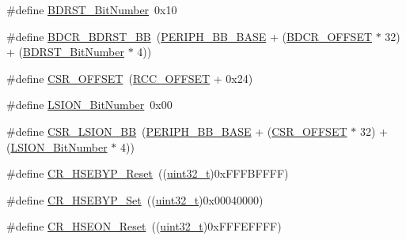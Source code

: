 \begin{DoxyCompactItemize}
\item 
\#define \hyperlink{group___r_c_c___private___defines_gae6718158034388d8fde8caaa28ffe8b9}{B\+D\+R\+S\+T\+\_\+\+Bit\+Number}~0x10
\item 
\#define \hyperlink{group___r_c_c___private___defines_ga892fdf297b85b85cbaf0723649b31818}{B\+D\+C\+R\+\_\+\+B\+D\+R\+S\+T\+\_\+\+BB}~(\hyperlink{openmotestm_2library_2inc_2stm32f10x__map_8h_aed7efc100877000845c236ccdc9e144a}{P\+E\+R\+I\+P\+H\+\_\+\+B\+B\+\_\+\+B\+A\+SE} + (\hyperlink{openmotestm_2library_2src_2stm32f10x__rcc_8c_a5f8a0c3cb5f5c835bf7eef09515138ad}{B\+D\+C\+R\+\_\+\+O\+F\+F\+S\+ET} $\ast$ 32) + (\hyperlink{openmotestm_2library_2src_2stm32f10x__rcc_8c_ae6718158034388d8fde8caaa28ffe8b9}{B\+D\+R\+S\+T\+\_\+\+Bit\+Number} $\ast$ 4))
\item 
\#define \hyperlink{group___r_c_c___private___defines_ga984cbe73312b6d3d355c5053763d499a}{C\+S\+R\+\_\+\+O\+F\+F\+S\+ET}~(\hyperlink{openmotestm_2library_2src_2stm32f10x__rcc_8c_a539e07c3b3c55f1f1d47231341fb11e1}{R\+C\+C\+\_\+\+O\+F\+F\+S\+ET} + 0x24)
\item 
\#define \hyperlink{group___r_c_c___private___defines_ga3f9dbe50769ce2a63ae12520433b9b40}{L\+S\+I\+O\+N\+\_\+\+Bit\+Number}~0x00
\item 
\#define \hyperlink{group___r_c_c___private___defines_gaa253e36e7e5fb02998c0e4d0388abc52}{C\+S\+R\+\_\+\+L\+S\+I\+O\+N\+\_\+\+BB}~(\hyperlink{openmotestm_2library_2inc_2stm32f10x__map_8h_aed7efc100877000845c236ccdc9e144a}{P\+E\+R\+I\+P\+H\+\_\+\+B\+B\+\_\+\+B\+A\+SE} + (\hyperlink{openmotestm_2library_2src_2stm32f10x__rcc_8c_a984cbe73312b6d3d355c5053763d499a}{C\+S\+R\+\_\+\+O\+F\+F\+S\+ET} $\ast$ 32) + (\hyperlink{openmotestm_2library_2src_2stm32f10x__rcc_8c_a3f9dbe50769ce2a63ae12520433b9b40}{L\+S\+I\+O\+N\+\_\+\+Bit\+Number} $\ast$ 4))
\item 
\#define \hyperlink{group___r_c_c___private___defines_ga98f5ef520febdb0a1cd8f407f8e5e62f}{C\+R\+\_\+\+H\+S\+E\+B\+Y\+P\+\_\+\+Reset}~((\hyperlink{_p_e___types_8h_a33594304e786b158f3fb30289278f5af}{uint32\+\_\+t})0x\+F\+F\+F\+B\+F\+F\+F\+F)
\item 
\#define \hyperlink{group___r_c_c___private___defines_ga84972845ff646ce1d3902d54dd7b9bc6}{C\+R\+\_\+\+H\+S\+E\+B\+Y\+P\+\_\+\+Set}~((\hyperlink{_p_e___types_8h_a33594304e786b158f3fb30289278f5af}{uint32\+\_\+t})0x00040000)
\item 
\#define \hyperlink{group___r_c_c___private___defines_ga8185e6ea6e9abafcdee0e5f58e62805e}{C\+R\+\_\+\+H\+S\+E\+O\+N\+\_\+\+Reset}~((\hyperlink{_p_e___types_8h_a33594304e786b158f3fb30289278f5af}{uint32\+\_\+t})0x\+F\+F\+F\+E\+F\+F\+F\+F)

\end{DoxyCompactItemize}
